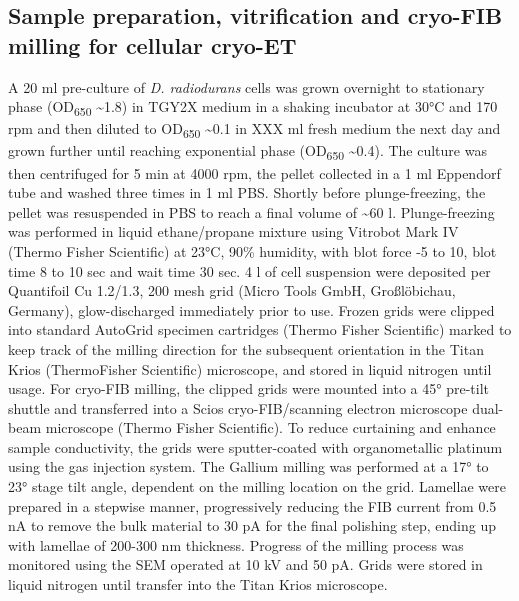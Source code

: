 \subsection{Sample preparation, vitrification and cryo-FIB milling for cellular cryo-ET}
A 20 ml pre-culture of \textit{D. radiodurans} cells was grown overnight to stationary phase (OD\textsubscript{650} \sim1.8) in TGY2X medium in a shaking incubator at \ang{30}C and 170 rpm and then diluted to OD\textsubscript{650} \sim0.1 in XXX ml fresh medium the next day and grown further until reaching exponential phase (OD\textsubscript{650} \sim0.4).
The culture was then centrifuged for 5 min at 4000 rpm, the pellet collected in a 1 ml Eppendorf tube and washed three times in 1 ml PBS.
Shortly before plunge-freezing, the pellet was resuspended in PBS to reach a final volume of \sim60 \mu{}l.
Plunge-freezing was performed in liquid ethane/propane mixture using Vitrobot Mark IV (Thermo Fisher Scientific) at \ang{23}C, 90\% humidity, with blot force -5 to 10, blot time 8 to 10 sec and wait time 30 sec.
4 \mu{}l of cell suspension were deposited per Quantifoil Cu 1.2/1.3, 200 mesh grid (Micro Tools GmbH, Großlöbichau, Germany), glow-discharged immediately prior to use.
Frozen grids were clipped into standard AutoGrid specimen cartridges (Thermo Fisher Scientific) marked to keep track of the milling direction for the subsequent orientation in the Titan Krios (ThermoFisher Scientific) microscope, and stored in liquid nitrogen until usage.
For cryo-FIB milling, the clipped grids were mounted into a \ang{45} pre-tilt shuttle and transferred into a Scios cryo-FIB/scanning electron microscope dual-beam microscope (Thermo Fisher Scientific).
To reduce curtaining and enhance sample conductivity, the grids were sputter-coated with organometallic platinum using the gas injection system.
The Gallium milling was performed at a \ang{17} to \ang{23} stage tilt angle, dependent on the milling location on the grid.
Lamellae were prepared in a stepwise manner, progressively reducing the FIB current from 0.5 nA to remove the bulk material to 30 pA for the final polishing step, ending up with lamellae of 200-300 nm thickness.
Progress of the milling process was monitored using the SEM operated at 10 kV and 50 pA.
Grids were stored in liquid nitrogen until transfer into the Titan Krios microscope.


